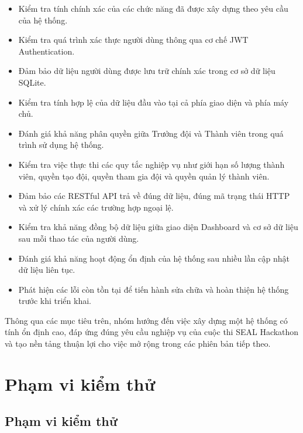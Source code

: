 \begin{itemize}
	\item Kiểm tra tính chính xác của các chức năng đã được xây dựng theo yêu cầu của hệ thống.
	
	\item Kiểm tra quá trình xác thực người dùng thông qua cơ chế JWT Authentication.
	
	\item Đảm bảo dữ liệu người dùng được lưu trữ chính xác trong cơ sở dữ liệu SQLite.
	
	\item Kiểm tra tính hợp lệ của dữ liệu đầu vào tại cả phía giao diện và phía máy chủ.
	
	\item Đánh giá khả năng phân quyền giữa Trưởng đội và Thành viên trong quá trình sử dụng hệ thống.
	
	\item Kiểm tra việc thực thi các quy tắc nghiệp vụ như giới hạn số lượng thành viên, quyền tạo đội, quyền tham gia đội và quyền quản lý thành viên.
	
	\item Đảm bảo các RESTful API trả về đúng dữ liệu, đúng mã trạng thái HTTP và xử lý chính xác các trường hợp ngoại lệ.
	
	\item Kiểm tra khả năng đồng bộ dữ liệu giữa giao diện Dashboard và cơ sở dữ liệu sau mỗi thao tác của người dùng.
	
	\item Đánh giá khả năng hoạt động ổn định của hệ thống sau nhiều lần cập nhật dữ liệu liên tục.
	
	\item Phát hiện các lỗi còn tồn tại để tiến hành sửa chữa và hoàn thiện hệ thống trước khi triển khai.
\end{itemize}

Thông qua các mục tiêu trên, nhóm hướng đến việc xây dựng một hệ thống có tính ổn định cao, đáp ứng đúng yêu cầu nghiệp vụ của cuộc thi SEAL Hackathon và tạo nền tảng thuận lợi cho việc mở rộng trong các phiên bản tiếp theo.


\section{Phạm vi kiểm thử}

\subsection{Phạm vi kiểm thử}

